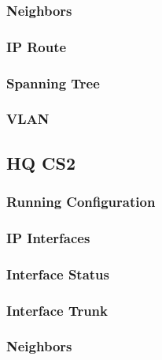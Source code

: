 \subsubsection{Neighbors}


\subsubsection{IP Route}


\subsubsection{Spanning Tree}


\subsubsection{VLAN}





\subsection{HQ CS2}
\subsubsection{Running Configuration}


\subsubsection{IP Interfaces}


\subsubsection{Interface Status}


\subsubsection{Interface Trunk}


\subsubsection{Neighbors}



